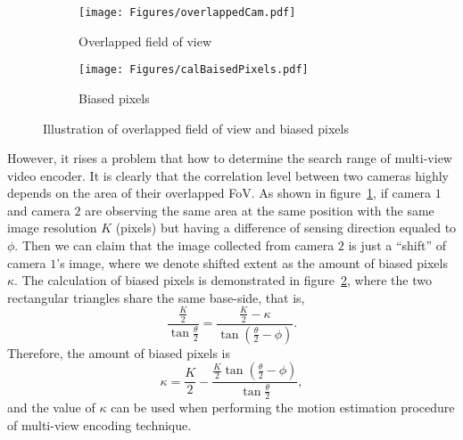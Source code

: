\begin{figure}
\begin{center}
\begin{subfigure}[b]{0.65\columnwidth}
\texttt{[image: Figures/overlappedCam.pdf]}
\caption{\label{fig::overlappedCam}Overlapped field of view}
\end{subfigure}
\begin{subfigure}[b]{0.5\columnwidth}
\texttt{[image: Figures/calBaisedPixels.pdf]}
\caption{\label{fig::calBaisedPixels}Biased pixels}
\end{subfigure}
\caption{\label{fig::overlappedAndBaised}Illustration of overlapped field of view and biased pixels}
\end{center}
\end{figure}
%
However, it rises a problem that how to determine the search range of multi-view video encoder.
It is clearly that the correlation level between two cameras highly depends on the area of their overlapped FoV.
As shown in figure~\ref{fig::overlappedCam}, if camera $1$ and camera $2$ are observing the same area at the same position with the same image resolution $K$ (pixels) but having a difference of sensing direction equaled to $\phi$.
Then we can claim that the image collected from camera $2$ is just a ``shift'' of camera $1$'s image, where we denote shifted extent as the amount of biased pixels $\kappa$.
The calculation of biased pixels is demonstrated in figure~\ref{fig::calBaisedPixels}, where the two rectangular triangles share the same base-side, that is,
\begin{equation}
\frac{\frac{K}{2}}{\tan \frac{\theta}{2}} = \frac{\frac{K}{2}-\kappa}{\tan(\frac{\theta}{2}-\phi)}.
\label{eq::calBiasedPixels}
\end{equation}
Therefore, the amount of biased pixels is
\begin{equation}
\kappa = \frac{K}{2} - \frac{\frac{K}{2} \tan(\frac{\theta}{2}-\phi) }{\tan \frac{\theta}{2}},
\label{eq::biasedPixels}
\end{equation}
and the value of $\kappa$ can be used when performing the motion estimation procedure of multi-view encoding technique.
%